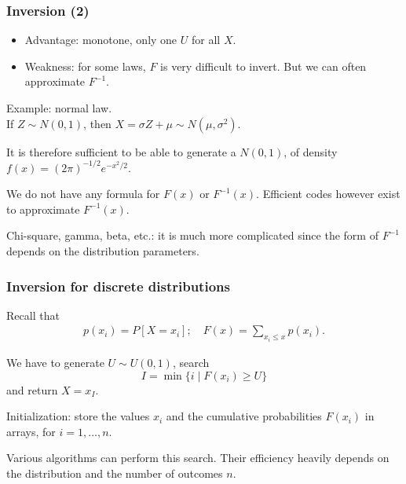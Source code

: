 \documentclass[aspectratio=169]{beamer}
\def\red{\color{red}}
\begin{document}
	\begin{frame}
		\frametitle{Inversion (2)}
		
		\begin{itemize}
			\item
			{\red Advantage}: monotone, only one $U$ for all $X$.
			\item
			{\red Weakness}: for some laws, $F$ is very difficult to invert.
			But we can often approximate $F^{-1}$.
		\end{itemize}
		
		\mbox{}
		
		{\red Example}: normal law.\\
		If $Z \sim N (0, 1)$, then $X =  \sigma Z + \mu \sim N (\mu, \sigma^2)$.
		
		It is therefore sufficient to be able to generate a $N (0, 1)$, of
		density $f (x) = (2 \pi)^{-1/2} e^{-x^2 /2}$.
		
		We do not have any formula for $F (x)$ or $F^{-1}(x)$.
		Efficient codes however exist to approximate $F^{-1}(x)$.
		
		\mbox{}
		
		Chi-square, gamma, beta, etc.: it is much more complicated since the
		form of $F^{-1}$ depends on the distribution parameters.
		
	\end{frame}
	
	\begin{frame}
		\frametitle{Inversion for discrete distributions}
		
		Recall that
		\begin{align*}
			p(x_i) = P [X = x_i];\quad 
			F (x) = \sum_{x_i \leq x} p(x_i).
		\end{align*}
		
		We have to generate $U \sim U(0,1)$, search 
		\[
		I = \min \lbrace i \mid F (x_i)  \geq U \rbrace
		\]
		and return $X = x_I$.
		
		\vspace{0.4cm}
		{\red Initialization}: store the values $x_i$ and the cumulative probabilities $F (x_i)$ in arrays, for $i = 1, \ldots, n$.
		
		\vspace{0.2cm}
		Various algorithms can perform this search. Their efficiency heavily depends on the distribution and the number of outcomes $n$.
	\end{frame}
	
\end{document}
